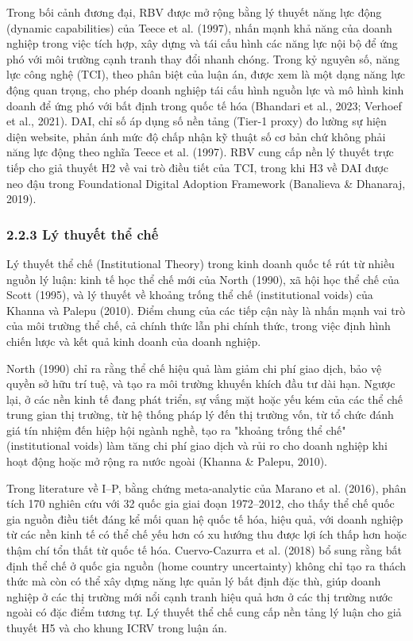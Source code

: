 \documentclass[12pt,a4paper]{article}
\begin{document}
Trong bối cảnh đương đại, RBV được mở rộng bằng lý thuyết năng lực động
(dynamic capabilities) của Teece et al. (1997), nhấn mạnh khả năng của
doanh nghiệp trong việc tích hợp, xây dựng và tái cấu hình các năng lực
nội bộ để ứng phó với môi trường cạnh tranh thay đổi nhanh chóng. Trong
kỷ nguyên số, năng lực công nghệ (TCI), theo phân biệt của luận án, được
xem là một dạng năng lực động quan trọng, cho phép doanh nghiệp tái cấu
hình nguồn lực và mô hình kinh doanh để ứng phó với bất định trong quốc
tế hóa (Bhandari et al., 2023; Verhoef et al., 2021). DAI, chỉ số áp
dụng số nền tảng (Tier-1 proxy) đo lường sự hiện diện website, phản ánh
mức độ chấp nhận kỹ thuật số cơ bản chứ không phải năng lực động theo
nghĩa Teece et al. (1997). RBV cung cấp nền lý thuyết trực tiếp cho giả
thuyết H2 về vai trò điều tiết của TCI, trong khi H3 về DAI được neo đậu
trong Foundational Digital Adoption Framework (Banalieva \& Dhanaraj,
2019).

\hypertarget{223-luxfd-thuyux1ebft-thux1ec3-chux1ebf}{%
\subsubsection{2.2.3 Lý thuyết thể
chế}\label{223-luxfd-thuyux1ebft-thux1ec3-chux1ebf}}

Lý thuyết thể chế (Institutional Theory) trong kinh doanh quốc tế rút từ
nhiều nguồn lý luận: kinh tế học thể chế mới của North (1990), xã hội
học thể chế của Scott (1995), và lý thuyết về khoảng trống thể chế
(institutional voids) của Khanna và Palepu (2010). Điểm chung của các
tiếp cận này là nhấn mạnh vai trò của môi trường thể chế, cả chính thức
lẫn phi chính thức, trong việc định hình chiến lược và kết quả kinh
doanh của doanh nghiệp.

North (1990) chỉ ra rằng thể chế hiệu quả làm giảm chi phí giao dịch,
bảo vệ quyền sở hữu trí tuệ, và tạo ra môi trường khuyến khích đầu tư
dài hạn. Ngược lại, ở các nền kinh tế đang phát triển, sự vắng mặt hoặc
yếu kém của các thể chế trung gian thị trường, từ hệ thống pháp lý đến
thị trường vốn, từ tổ chức đánh giá tín nhiệm đến hiệp hội ngành nghề,
tạo ra "khoảng trống thể chế" (institutional voids) làm tăng chi phí
giao dịch và rủi ro cho doanh nghiệp khi hoạt động hoặc mở rộng ra nước
ngoài (Khanna \& Palepu, 2010).

Trong literature về I--P, bằng chứng meta-analytic của Marano et al.
(2016), phân tích 170 nghiên cứu với 32 quốc gia giai đoạn 1972--2012,
cho thấy thể chế quốc gia nguồn điều tiết đáng kể mối quan hệ quốc tế
hóa, hiệu quả, với doanh nghiệp từ các nền kinh tế có thể chế yếu hơn có
xu hướng thu được lợi ích thấp hơn hoặc thậm chí tổn thất từ quốc tế
hóa. Cuervo-Cazurra et al. (2018) bổ sung rằng bất định thể chế ở quốc
gia nguồn (home country uncertainty) không chỉ tạo ra thách thức mà còn
có thể xây dựng năng lực quản lý bất định đặc thù, giúp doanh nghiệp ở
các thị trường mới nổi cạnh tranh hiệu quả hơn ở các thị trường nước
ngoài có đặc điểm tương tự. Lý thuyết thể chế cung cấp nền tảng lý luận
cho giả thuyết H5 và cho khung ICRV trong luận án.
\end{document}

